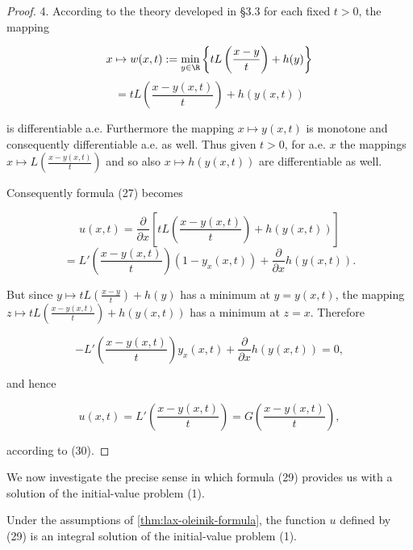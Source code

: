 \begin{proof}
4. According to the theory developed in \S3.3 for each fixed $t > 0$, the mapping

$$x \mapsto w(x,t) := \min_{y \in \R}\left\{tL\left(\frac{x-y}{t}\right) + h(y)\right\}$$
$$= tL\left(\frac{x-y(x,t)}{t}\right) + h(y(x,t))$$

is differentiable a.e. Furthermore the mapping $x \mapsto y(x,t)$ is monotone and consequently differentiable a.e. as well. Thus given $t > 0$, for a.e. $x$ the mappings $x \mapsto L\left(\frac{x-y(x,t)}{t}\right)$ and so also $x \mapsto h(y(x,t))$ are differentiable as well.

Consequently formula (27) becomes

$$u(x,t) = \frac{\partial}{\partial x}\left[tL\left(\frac{x-y(x,t)}{t}\right) + h(y(x,t))\right]$$
$$= L'\left(\frac{x-y(x,t)}{t}\right)(1-y_x(x,t)) + \frac{\partial}{\partial x}h(y(x,t)).$$

But since $y \mapsto tL\left(\frac{x-y}{t}\right) + h(y)$ has a minimum at $y = y(x,t)$, the mapping $z \mapsto tL\left(\frac{x-y(x,t)}{t}\right) + h(y(x,t))$ has a minimum at $z = x$. Therefore

$$-L'\left(\frac{x-y(x,t)}{t}\right)y_x(x,t) + \frac{\partial}{\partial x}h(y(x,t)) = 0,$$

and hence

$$u(x,t) = L'\left(\frac{x-y(x,t)}{t}\right) = G\left(\frac{x-y(x,t)}{t}\right),$$

according to (30).
\end{proof}

We now investigate the precise sense in which formula (29) provides us with a solution of the initial-value problem (1).

\begin{theorem}
\label{thm:lax-oleinik-integral-solution}
Under the assumptions of \cref{thm:lax-oleinik-formula}, the function $u$ defined by (29) is an integral solution of the initial-value problem (1).
\end{theorem}

